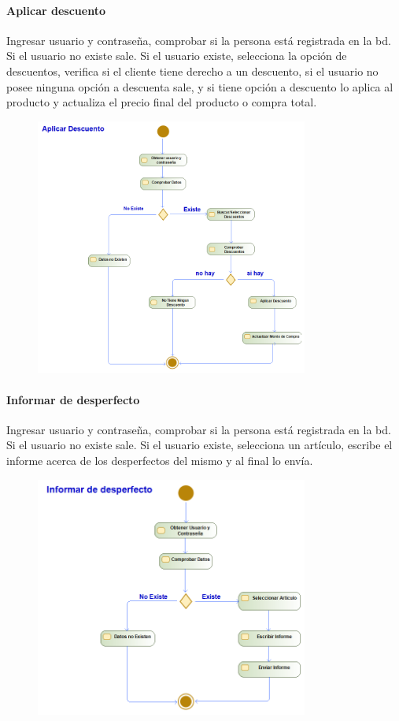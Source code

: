 \paragraph{Aplicar descuento}
Ingresar usuario y contraseña, comprobar si la persona está registrada en la \gls{bd}. Si el usuario no existe sale. Si el usuario existe, selecciona la opción de descuentos, verifica si el cliente tiene derecho a un descuento, si el usuario no posee ninguna opción a descuenta sale, y si tiene opción a descuento lo aplica al producto y actualiza el precio final del producto o compra total.
\begin{figure}[H]
    \centering
    \includegraphics[width=0.8\textwidth]{Use_Cases/aplicar_descuento.png}
\end{figure}
\paragraph{Informar de desperfecto}
Ingresar usuario y contraseña, comprobar si la persona está registrada en la \gls{bd}. Si el usuario no existe sale. Si el usuario existe, selecciona un artículo, escribe el informe acerca de los desperfectos del mismo y al final lo envía.
\begin{figure}[H]
    \centering
    \includegraphics[width=0.8\textwidth]{Use_Cases/informar_de_desperfecto.png}
\end{figure}

